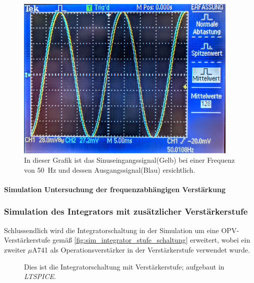 \documentclass[12pt,english,ngerman]{scrartcl}
\begin{document}
\begin{figure}[H]
  \centering
   \includegraphics[width=0.95\textwidth]{./figures/integrator/50hz.jpg}
    \caption{In dieser Grafik ist das Sinuseingangssignal(Gelb) bei einer Frequenz von
    \SI{50}{\Hz} und dessen Ausgangssignal(Blau) ersichtlich.}
  \label{fig:mess_integrator_50hz}
\end{figure}

\paragraph{Simulation Untersuchung der frequenzabhängigen Verstärkung}

\subsubsection{Simulation des Integrators mit zusätzlicher Verstärkerstufe}

Schlussendlich wird die Integratorschaltung in der Simulation um eine
OPV-Verstärkerstufe gemäß \autoref{fig:sim_integrator_stufe_schaltung} erweitert, wobei ein
zweiter $\mu$A741 als Operationsverstärker in der Verstärkerstufe verwendet wurde.

\begin{figure}[H]
  \centering
  \caption{Dies ist die Integratorschaltung mit Verstärkerstufe; aufgebaut in \textit{LTSPICE}.}
  \label{fig:sim_integrator_stufe_schaltung}
\end{figure}
\end{document}
